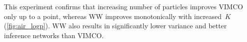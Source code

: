 This experiment confirms that increasing number of particles improves \gls{VIMCO} only up to a point, whereas \gls{WW} improves monotonically with increased~\(K\) (\cref{fig:air_logp}).
%
\Gls{WW} also results in significantly lower variance and better inference networks than \gls{VIMCO}.

%
%
%
%
%



